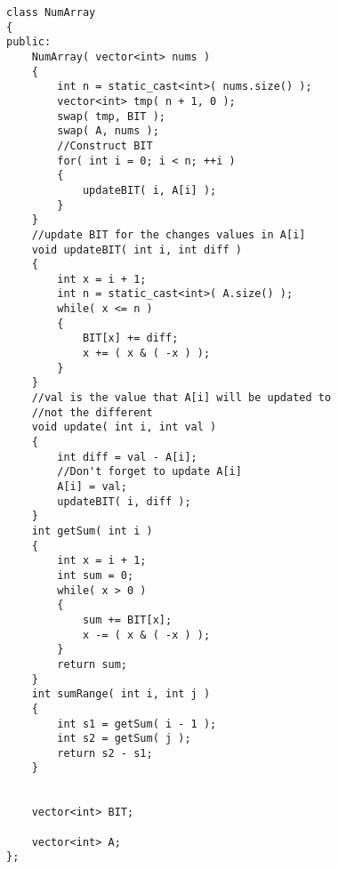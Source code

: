 \begin{lstlisting}[style=customc, caption={BIT}]
class NumArray
{
public:
    NumArray( vector<int> nums )
    {
        int n = static_cast<int>( nums.size() );
        vector<int> tmp( n + 1, 0 );
        swap( tmp, BIT );
        swap( A, nums );
        //Construct BIT
        for( int i = 0; i < n; ++i )
        {
            updateBIT( i, A[i] );
        }
    }
    //update BIT for the changes values in A[i]
    void updateBIT( int i, int diff )
    {
        int x = i + 1;
        int n = static_cast<int>( A.size() );
        while( x <= n )
        {
            BIT[x] += diff;
            x += ( x & ( -x ) );
        }
    }
    //val is the value that A[i] will be updated to
    //not the different
    void update( int i, int val )
    {
        int diff = val - A[i];
        //Don't forget to update A[i]
        A[i] = val;
        updateBIT( i, diff );
    }
    int getSum( int i )
    {
        int x = i + 1;
        int sum = 0;
        while( x > 0 )
        {
            sum += BIT[x];
            x -= ( x & ( -x ) );
        }
        return sum;
    }
    int sumRange( int i, int j )
    {
        int s1 = getSum( i - 1 );
        int s2 = getSum( j );
        return s2 - s1;
    }


    vector<int> BIT;

    vector<int> A;
};

\end{lstlisting}


